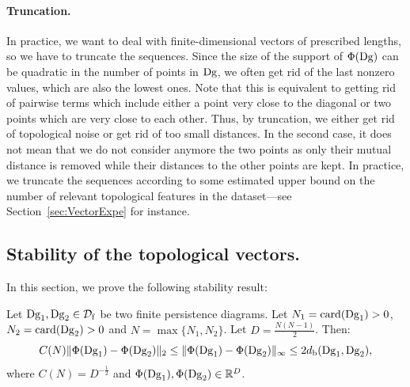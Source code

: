 \paragraph*{Truncation.}
In practice, we want to deal with finite-dimensional vectors of prescribed lengths, so we have to truncate the sequences. 
Since the size of the support of $\Phi(\mathrm{Dg})$ can be quadratic in the number of points in $\mathrm{Dg}$, we often
get rid of the last nonzero values, which are also the lowest ones. Note that this is equivalent to getting rid of 
pairwise terms which include either a point very close to the diagonal
or two points which are very close to each other. Thus, by truncation, 
we either get rid of topological noise or get rid of too small distances. In the second case, it does not mean that we do not consider anymore 
the two points as only their mutual distance is removed while their distances to the other points are kept. In practice, we 
truncate the sequences according to some estimated upper bound on the number of relevant topological features in the dataset---see
Section~\ref{sec:VectorExpe} for instance. 

\subsection{Stability of the topological vectors.}\label{sec:StabVect}

In this section, we prove the following stability result:

\begin{thm}
\label{sign}
Let $\mathrm{Dg}_1,\mathrm{Dg}_2\in{\mathcal D}_{\rm f}$ be two finite persistence diagrams. %
Let $N_1={\rm card}(\mathrm{Dg}_1)>0$, $N_2={\rm card}(\mathrm{Dg}_2)>0$ and $N=\max\{N_1,N_2\}$. Let $D=\frac{N(N-1)}{2}$.
Then:
$$C(N)\|\Phi(\mathrm{Dg}_1)-\Phi(\mathrm{Dg}_2)\|_2\leq\|\Phi(\mathrm{Dg}_1)-\Phi(\mathrm{Dg}_2)\|_\infty\leq 2d_{\rm b}(\mathrm{Dg}_1,\mathrm{Dg}_2),$$
where $C(N)=D^{-\frac 12}$ and $\Phi(\mathrm{Dg}_1),\Phi(\mathrm{Dg}_2)\in\mathbb{R}^D$.
\end{thm}

